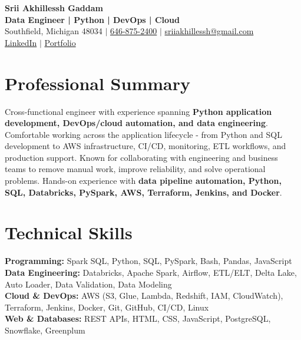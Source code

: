 \documentclass[letterpaper,10pt]{article}
\begin{document}
\fontsize{9.35pt}{10.45pt}\selectfont

\begin{center}
    {\LARGE \textbf{Srii Akhillessh Gaddam}} \\[-1pt]
    \textbf{Data Engineer | Python | DevOps | Cloud} \\[2pt]
    Southfield, Michigan 48034 $|$
    \href{tel:6468752400}{646-875-2400} $|$
    \href{mailto:sriiakhillessh@gmail.com}{sriiakhillessh@gmail.com} \\[1pt]
    \href{https://www.linkedin.com/in/srii-akhiilessh-gaddam-b48668191/}{LinkedIn} $|$
    \href{https://sriiakhillesshg.github.io/portfolio/}{Portfolio}
\end{center}
\vspace{-8pt}

\section{Professional Summary}
\small{Cross-functional engineer with experience spanning \textbf{Python application development, DevOps/cloud automation, and data engineering}. Comfortable working across the application lifecycle - from Python and SQL development to AWS infrastructure, CI/CD, monitoring, ETL workflows, and production support. Known for collaborating with engineering and business teams to remove manual work, improve reliability, and solve operational problems. Hands-on experience with \textbf{data pipeline automation, Python, SQL, Databricks, PySpark, AWS, Terraform, Jenkins, and Docker}.}

\section{Technical Skills}
\small{
\textbf{Programming:} Spark SQL, Python, SQL, PySpark, Bash, Pandas, JavaScript \\
\textbf{Data Engineering:} Databricks, Apache Spark, Airflow, ETL/ELT, Delta Lake, Auto Loader, Data Validation, Data Modeling \\
\textbf{Cloud \& DevOps:} AWS (S3, Glue, Lambda, Redshift, IAM, CloudWatch), Terraform, Jenkins, Docker, Git, GitHub, CI/CD, Linux \\
\textbf{Web \& Databases:} REST APIs, HTML, CSS, JavaScript, PostgreSQL, Snowflake, Greenplum
}

\end{document}
